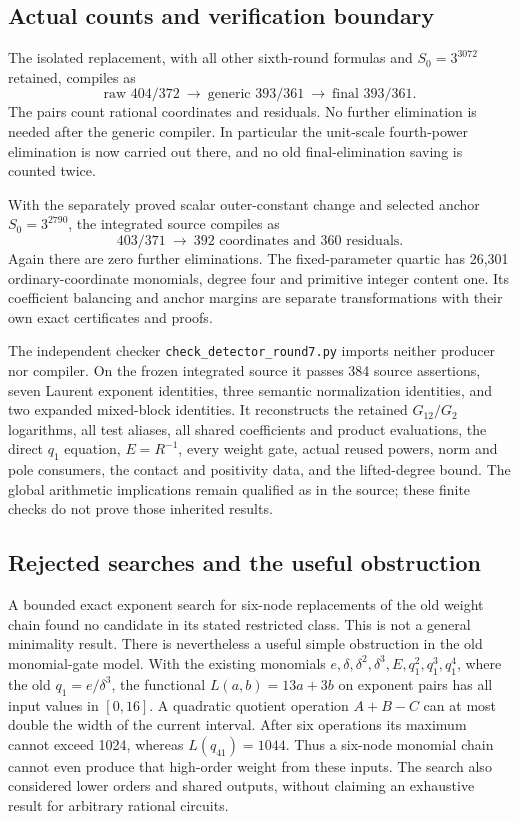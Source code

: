 \subsection{Actual counts and verification boundary}

The isolated replacement, with all other sixth-round formulas and
$S_0=3^{3072}$ retained, compiles as
\[
 \text{raw }404/372\ \longrightarrow\
 \text{generic }393/361\ \longrightarrow\
 \boxed{\text{final }393/361}.
\]
The pairs count rational coordinates and residuals. No further
elimination is needed after the generic compiler. In particular the
unit-scale fourth-power elimination is now carried out there, and no
old final-elimination saving is counted twice.

With the separately proved scalar outer-constant change and selected
anchor $S_0=3^{2790}$, the integrated source compiles as
\[
 403/371\ \longrightarrow\
 \boxed{392\text{ coordinates and }360\text{ residuals}}.
\]
Again there are zero further eliminations. The fixed-parameter quartic
has 26,301 ordinary-coordinate monomials, degree four and primitive
integer content one. Its coefficient balancing and anchor margins are
separate transformations with their own exact certificates and proofs.

The independent checker \texttt{check\_detector\_round7.py} imports
neither producer nor compiler. On the frozen integrated source it passes
384 source assertions, seven Laurent exponent identities, three semantic
normalization identities, and two expanded mixed-block identities.
It reconstructs the retained $G_{12}/G_2$ logarithms, all test aliases,
all shared coefficients and product evaluations, the direct $q_1$
equation, $E=R^{-1}$, every weight gate, actual reused powers, norm and
pole consumers, the contact and positivity data, and the lifted-degree
bound. The global arithmetic implications remain qualified as in the
source; these finite checks do not prove those inherited results.

\subsection{Rejected searches and the useful obstruction}

A bounded exact exponent search for six-node replacements of the old
weight chain found no candidate in its stated restricted class. This is
not a general minimality result. There is nevertheless a useful simple
obstruction in the old monomial-gate model. With the existing monomials
$e,\delta,\delta^2,\delta^3,E,q_1^2,q_1^3,q_1^4$, where the old
$q_1=e/\delta^3$, the functional $L(a,b)=13a+3b$ on exponent pairs
has all input values in $[0,16]$. A quadratic quotient operation
$A+B-C$ can at most double the width of the current interval.
After six operations its maximum cannot exceed 1024, whereas
$L(q_{41})=1044$. Thus a six-node monomial chain cannot even produce
that high-order weight from these inputs. The search also considered
lower orders and shared outputs, without claiming an exhaustive result
for arbitrary rational circuits.

